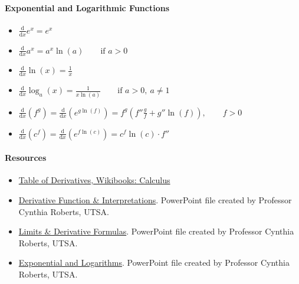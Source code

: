 \paragraph{Exponential and Logarithmic Functions}



\begin{itemize}
    \item $\frac{\mathrm{d}}{\mathrm{d}x}e^x=e^x$
    \item $\frac{\mathrm{d}}{\mathrm{d}x}a^x=a^x\ln(a)\qquad\text{if }a>0$
    \item $\frac{\mathrm{d}}{\mathrm{d}x}\ln(x)=\frac{1}{x}$
    \item $\frac{\mathrm{d}}{\mathrm{d}x}\log_a(x)=\frac{1}{x\ln(a)}\qquad\text{if }a>0,\ a\ne1$
    \item $\frac{\mathrm{d}}{\mathrm{d}x}(f^g)=\frac{\mathrm{d}}{\mathrm{d}x}\left(e^{g\ln(f)}\right)=f^g\left(f''\frac{g}{f}+g''\ln(f)\right),\qquad f>0$
    \item $\frac{\mathrm{d}}{\mathrm{d}x}(c^f)=\frac{\mathrm{d}}{\mathrm{d}x}\left(e^{f\ln(c)}\right)=c^f\ln(c)\cdot f''$
\end{itemize}



\paragraph{Resources}



\begin{itemize}
    \item \href{https://en.wikibooks.org/wiki/Calculus/Tables_of_Derivatives}{Table of Derivatives, Wikibooks: Calculus}
    \item \href{https://mathresearch.utsa.edu/wikiFiles/MAT1193/Derivative\%20Formulas/Presentation3_DerivativeFunction\%20\&\%20Interpretations.pptx}{Derivative Function \& Interpretations}. PowerPoint file created by Professor Cynthia Roberts, UTSA.
    \item \href{https://mathresearch.utsa.edu/wikiFiles/MAT1193/Derivative\%20Formulas/Presentation3b,4,5_Limits\%20\&\%20Derivative\%20Formulas.pptx}{Limits \& Derivative Formulas}. PowerPoint file created by Professor Cynthia Roberts, UTSA.
    \item \href{https://mathresearch.utsa.edu/wikiFiles/MAT1193/Derivative\%20Formulas/Presentation5b_Exponential\%20and\%20Logs.pptx}{Exponential and Logarithms}. PowerPoint file created by Professor Cynthia Roberts, UTSA.
\end{itemize}


